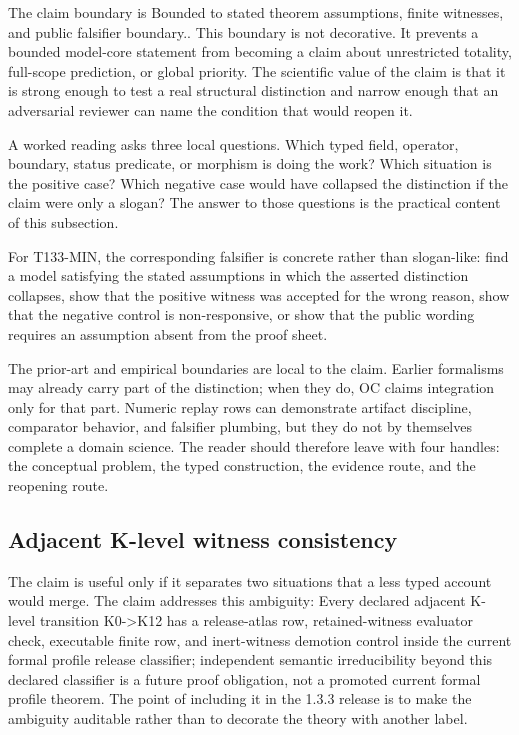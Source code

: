 The claim boundary is Bounded to stated theorem assumptions, finite witnesses, and public falsifier boundary.. This boundary is not decorative. It prevents a bounded model-core statement from becoming a claim about unrestricted totality, full-scope prediction, or global priority. The scientific value of the claim is that it is strong enough to test a real structural distinction and narrow enough that an adversarial reviewer can name the condition that would reopen it.

A worked reading asks three local questions. Which typed field, operator, boundary, status predicate, or morphism is doing the work? Which situation is the positive case? Which negative case would have collapsed the distinction if the claim were only a slogan? The answer to those questions is the practical content of this subsection.

For T133-MIN, the corresponding falsifier is concrete rather than slogan-like: find a model satisfying the stated assumptions in which the asserted distinction collapses, show that the positive witness was accepted for the wrong reason, show that the negative control is non-responsive, or show that the public wording requires an assumption absent from the proof sheet.

The prior-art and empirical boundaries are local to the claim. Earlier formalisms may already carry part of the distinction; when they do, OC claims integration only for that part. Numeric replay rows can demonstrate artifact discipline, comparator behavior, and falsifier plumbing, but they do not by themselves complete a domain science. The reader should therefore leave with four handles: the conceptual problem, the typed construction, the evidence route, and the reopening route.

\subsection{Adjacent K-level witness consistency}
The claim is useful only if it separates two situations that a less typed account would merge. The claim addresses this ambiguity: Every declared adjacent K-level transition K0-\textgreater{}K12 has a release-atlas row, retained-witness evaluator check, executable finite row, and inert-witness demotion control inside the current formal profile release classifier; independent semantic irreducibility beyond this declared classifier is a future proof obligation, not a promoted current formal profile theorem. The point of including it in the 1.3.3 release is to make the ambiguity auditable rather than to decorate the theory with another label.

